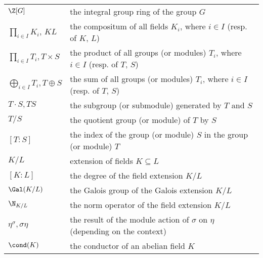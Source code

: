 \begin{longtable}[l]{ll}
  $\Z[G]$					& the integral group ring of the group $G$ \\[1mm]
  $\prod_{i\in I}K_i$, $KL$                 & the compositum of all fields $K_i$, where $i\in I$ (resp. of $K$, $L$)\\[1mm]
  $\prod_{i\in I}T_i, T\times S$                 & the product of all groups (or modules) $T_i$, where $i\in I$ (resp. of $\!T\!$, $\!S$)\\[1mm]
    $\bigoplus_{i\in I}T_i, T\oplus S$                 & the sum of all groups (or modules) $T_i$, where $i\in I$ (resp. of $T$, $S$)\\[1mm]
    $T\cdot S, TS$                 & the subgroup (or submodule) generated by $T$ and $S$ \\[1mm]
  $T/S$                 & the quotient group (or module) of $T$ by $S$ \\[1mm]
  $[T:S]$				    & the index of the group (or module) $S$ in the group (or module) $T$ \\[1mm]
  $K/L$					& extension of fields $K\subseteq L$ \\[1mm]
  $[K:L]$				& the degree of the field extension $K/L$ \\[1mm]
  $\Gal(K/L)$         & the Galois group of the Galois extension $K/L$ \\[1mm]
  $\N_{K/L}$         & the norm operator of the field extension $K/L$ \\[1mm]
  $\eta^{\sigma}, \sigma \eta$ & the result of the module action of $\sigma$ on $\eta$ (depending on the context)\\[1mm]
  $\cond(K)$			& the conductor of an abelian field $K$
\end{longtable}
